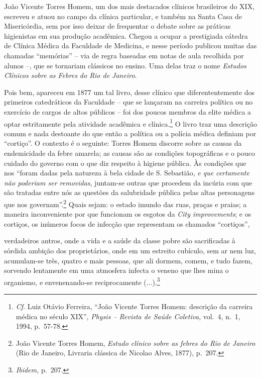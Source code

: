 João Vicente Torres Homem, um dos mais destacados clínicos brasileiros
do XIX, escreveu e atuou no campo da clínica particular, e também na
Santa Casa de Misericórdia, sem por isso deixar de frequentar o debate
sobre as práticas higienistas em sua produção acadêmica. Chegou a ocupar
a prestigiada cátedra de Clínica Médica da Faculdade de Medicina, e
nesse período publicou muitas das chamadas ``memórias'' -- via de regra
baseadas em notas de aula recolhida por alunos --, que se tornariam
clássicos no ensino. Uma delas traz o nome \emph{Estudos Clínicos sobre
as Febres do Rio de Janeiro}.

Pois bem, apareceu em 1877 um tal livro, desse clínico que
diferententemente dos primeiros catedráticos da Faculdade -- que se
lançaram na carreira política ou no exercício de cargos de altos
públicos -- foi dos poucos membros da elite médica a optar estritamente
pela atividade acadêmica e clínica.\footnote{\emph{Cf}. Luiz Otávio
  Ferreira, ``João Vicente Torres Homem: descrição da carreira médica no
  século XIX'', \emph{Physis -- Revista de Saúde Coletiva}, vol.~4,
  n.~1, 1994, p.~57-78.} O livro traz uma descrição comum e nada
destoante do que então a política ou a polícia médica definiam por
``cortiço''. O contexto é o seguinte: Torres Homem discorre sobre as
causas da endemicidade da febre amarela; as causas são as condições
topográficas e o pouco cuidado do governo com o que diz respeito à
higiene pública. Às condições que nos ``foram dadas pela natureza à bela
cidade de S. Sebastião, \emph{e que certamente não poderiam ser
removidas}, juntam-se outras que procedem da incúria com que são
tratadas entre nós as questões da salubridade pública pelas altas
personagens que nos governam''.\footnote{João Vicente Torres Homem,
  \emph{Estudo clínico sobre as febres do Rio de Janeiro} (Rio de
  Janeiro, Livraria clássica de Nicolao Alves, 1877), p.~207.} Quais
sejam: o estado imundo das ruas, praças e praias; a maneira
inconveniente por que funcionam os esgotos da \emph{City improvements};
e os cortiços, os inúmeros focos de infecção que representam os chamados
``cortiços'',

verdadeiros antros, onde a vida e a saúde da classe pobre são
sacrificadas à sórdida ambição dos proprietários, onde em um estreito
cubículo, sem ar nem luz, acumulam-se três, quatro e mais pessoas, que
ali dormem, comem, e tudo fazem, sorvendo lentamente em uma atmosfera
infecta o veneno que lhes mina o organismo, e envenenando-se
reciprocamente (...).\footnote{\emph{Ibidem,} p.~207.}


